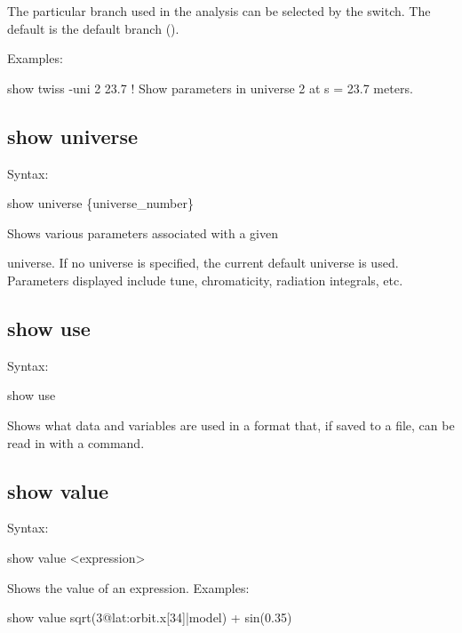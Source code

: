 {{{{{{{{{The particular branch used in the analysis can be selected by the  switch. The
default is the default branch ().

Examples:
\begin{example}
  show twiss -uni 2 23.7     ! Show parameters in universe 2 at s = 23.7 meters.
\end{example} 


\subsection{show universe}
\label{s:show.universe}

Syntax:
\begin{example}
  show universe \{universe_number\}
\end{example}

Shows various parameters associated with a given

universe. If no universe is specified, the current default universe is used. Parameters
displayed include tune, chromaticity, radiation integrals, etc.


\subsection{show use}
\label{s:show.use}

Syntax:
\begin{example}
  show use
\end{example}

Shows what data and variables are used in a format that, if saved to a file, can be read
in with a  command.


\subsection{show value}
\label{s:show.value}

Syntax:
\begin{example}
  show value <expression>
\end{example}


Shows the value of an expression. Examples:
\begin{example}
  show value sqrt(3@lat:orbit.x[34]|model) + sin(0.35)
\end{example}


}}}}}}}}}

